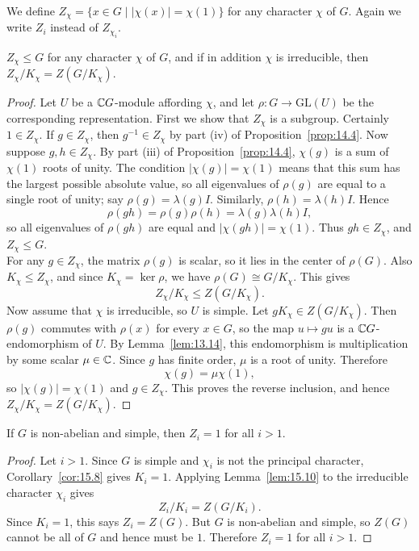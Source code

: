 \documentclass[../Odyssey_Project.tex]{subfiles}
\begin{document}
We define $Z_\chi = \{x \in G \mid |\chi(x)| = \chi(1)\}$ for any character $\chi$ of $G$. Again we write $Z_i$ instead of $Z_{\chi_i}$.

\begin{lemma}
\label{lem:15.10}
$Z_\chi \leq G$ for any character $\chi$ of $G$, and if in addition $\chi$ is irreducible, then $Z_\chi/K_\chi = Z(G/K_\chi)$.
\end{lemma}
\begin{proof}
    Let $U$ be a $\mathbb{C} G$-module affording $\chi$, and let $\rho\colon G\to\mathrm{GL}(U)$ be the corresponding representation. First we show that $Z_\chi$ is a subgroup. Certainly $1\in Z_\chi$. If $g\in Z_\chi$, then $g^{-1}\in Z_\chi$ by part (iv) of Proposition~\ref{prop:14.4}. Now suppose $g,h\in Z_\chi$. By part (iii) of Proposition~\ref{prop:14.4}, $\chi(g)$ is a sum of $\chi(1)$ roots of unity. The condition $|\chi(g)|=\chi(1)$ means that this sum has the largest possible absolute value, so all eigenvalues of $\rho(g)$ are equal to a single root of unity; say $\rho(g)=\lambda(g)I$. Similarly, $\rho(h)=\lambda(h)I$. Hence
    \[
        \rho(gh)=\rho(g)\rho(h)=\lambda(g)\lambda(h)I,
    \]
    so all eigenvalues of $\rho(gh)$ are equal and $|\chi(gh)|=\chi(1)$. Thus $gh\in Z_\chi$, and $Z_\chi\leq G$.\\
    For any $g\in Z_\chi$, the matrix $\rho(g)$ is scalar, so it lies in the center of $\rho(G)$. Also $K_\chi\leq Z_\chi$, and since $K_\chi=\ker\rho$, we have $\rho(G)\cong G/K_\chi$. This gives
    \[
        Z_\chi/K_\chi\leq Z(G/K_\chi).
    \]
    Now assume that $\chi$ is irreducible, so $U$ is simple. Let $gK_\chi\in Z(G/K_\chi)$. Then $\rho(g)$ commutes with $\rho(x)$ for every $x\in G$, so the map $u\mapsto gu$ is a $\mathbb{C} G$-endomorphism of $U$. By Lemma~\ref{lem:13.14}, this endomorphism is multiplication by some scalar $\mu\in\mathbb{C}$. Since $g$ has finite order, $\mu$ is a root of unity. Therefore
    \[
        \chi(g)=\mu\chi(1),
    \]
    so $|\chi(g)|=\chi(1)$ and $g\in Z_\chi$. This proves the reverse inclusion, and hence $Z_\chi/K_\chi=Z(G/K_\chi)$.
\end{proof}

\begin{corollary}
\label{cor:15.11}
If $G$ is non-abelian and simple, then $Z_i = 1$ for all $i > 1$.
\end{corollary}
\begin{proof}
    Let $i>1$. Since $G$ is simple and $\chi_i$ is not the principal character, Corollary~\ref{cor:15.8} gives $K_i=1$. Applying Lemma~\ref{lem:15.10} to the irreducible character $\chi_i$ gives
    \[
        Z_i/K_i=Z(G/K_i).
    \]
    Since $K_i=1$, this says $Z_i=Z(G)$. But $G$ is non-abelian and simple, so $Z(G)$ cannot be all of $G$ and hence must be $1$. Therefore $Z_i=1$ for all $i>1$.
\end{proof}
\end{document}
